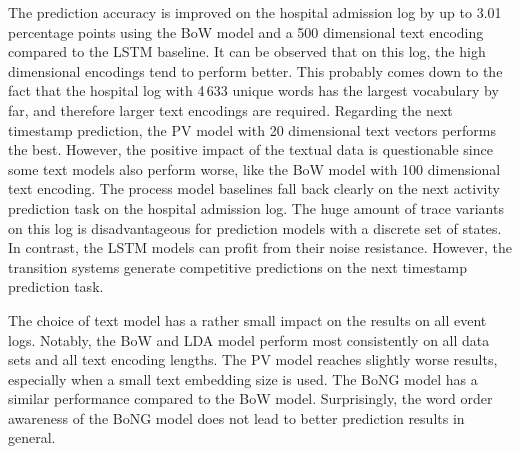 The prediction accuracy is improved on the hospital admission log by up to 3.01 percentage points using the BoW model and a 500 dimensional text encoding compared to the LSTM baseline.
It can be observed that on this log, the high dimensional encodings tend to perform better.
This probably comes down to the fact that the hospital log with 4\,633 unique words has the largest vocabulary by far, and therefore larger text encodings are required.
Regarding the next timestamp prediction, the PV model with 20 dimensional text vectors performs the best.
However, the positive impact of the textual data is questionable since some text models also perform worse, like the BoW model with 100 dimensional text encoding.
The process model baselines fall back clearly on the next activity prediction task on the hospital admission log.
The huge amount of trace variants on this log is disadvantageous for prediction models with a discrete set of states.
In contrast, the LSTM models can profit from their noise resistance.
However, the transition systems generate competitive predictions on the next timestamp prediction task.

The choice of text model has a rather small impact on the results on all event logs.
Notably, the BoW and LDA model perform most consistently on all data sets and all text encoding lengths.
The PV model reaches slightly worse results, especially when a small text embedding size is used.
The BoNG model has a similar performance compared to the BoW model.
Surprisingly, the word order awareness of the BoNG model does not lead to better prediction results in general.







